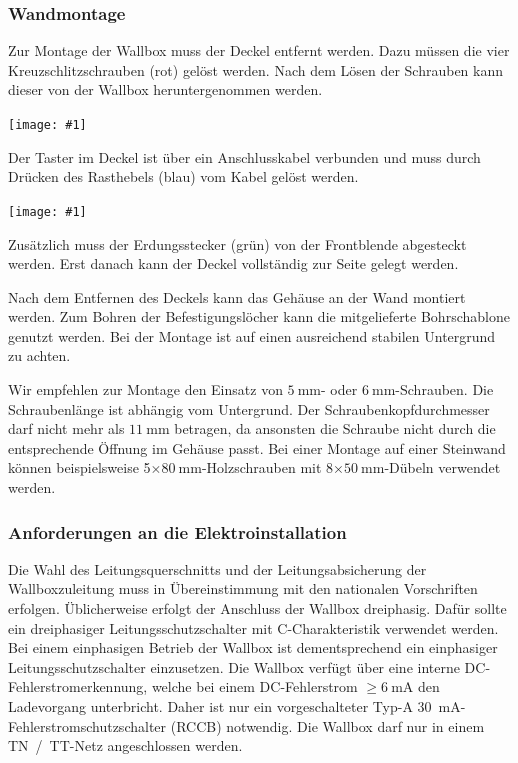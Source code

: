 \documentclass[a4paper,10pt]{article}
\newcommand{\hint}[1]{\begin{tcolorbox}[colback=boxgray,colframe=black,coltext=
white,title=Hinweis,left*=2mm,right*=2mm,boxsep=1mm,bottom=1mm,top=1mm]#1\end{tcolorbox}}
\newcommand{\gfx}[1]{\texttt{[image: \#1]}}
\begin{document}
\begin{multicols*}{2}
    \subsubsection{Wandmontage}\label{wandmontage}
    Zur Montage der Wallbox muss der Deckel entfernt werden. Dazu müssen die
    vier Kreuzschlitzschrauben (rot) gelöst werden.
    Nach dem Lösen der Schrauben kann dieser von der Wallbox heruntergenommen
    werden.

    \gfx{./img_warp3/resized/warp_screw_points_ready}


    \hint{Der Taster im Deckel ist über ein Anschlusskabel verbunden und muss
        durch Drücken des Rasthebels (blau) vom Kabel gelöst werden.}

    \gfx{./img_warp3/resized/warp3_frontLEDcable_arrow.jpg}

    Zusätzlich muss der Erdungsstecker (grün) von der Front\-blende abgesteckt werden.
    Erst danach kann der Deckel vollständig zur Seite gelegt werden.

    Nach dem Entfernen des Deckels kann das Gehäuse an der Wand montiert werden. Zum
    Bohren der Befestigungslöcher kann die mitgelieferte Bohrschablone genutzt
    werden. Bei der Montage ist auf einen ausreichend stabilen Untergrund zu
    achten.

    Wir empfehlen zur Montage den Einsatz von $\SI{5}{\milli\meter}$- oder
    $\SI{6}{\milli\meter}$-Schrauben. Die Schraubenlänge ist abhängig vom
    Untergrund. Der Schraubenkopfdurchmesser darf nicht mehr als
    $\SI{11}{\milli\meter}$ betragen, da ansonsten die Schraube nicht durch die
    entsprechende Öffnung im Gehäuse passt. Bei einer Montage auf einer Steinwand
    können beispielsweise 5$\times\SI{80}{\milli\meter}$-Holzschrauben
    mit 8$\times\SI{50}{\milli\meter}$-Dübeln verwendet werden.

    \subsubsection{Anforderungen an die Elektroinstallation}
    Die Wahl des Leitungsquerschnitts und der Lei\-tungs\-ab\-sicher\-ung der
    Wallboxzuleitung muss in Übereinstimmung mit den nationalen Vorschriften
    erfolgen. Üblicherweise erfolgt der Anschluss der Wallbox dreiphasig.
    Dafür sollte ein dreiphasiger Leitungsschutzschalter mit C-Charakteristik
    verwendet werden. Bei einem einphasigen Betrieb der Wallbox ist
    dementsprechend ein einphasiger Leitungsschutzschalter einzusetzen.
    Die Wallbox verfügt über eine interne DC-Fehlerstromerkennung, welche
    bei einem DC-Fehlerstrom $\geq \SI{6}{\milli\ampere}$ den Ladevorgang
    unterbricht. Daher ist nur ein vorgeschalteter Typ-A \SI{30}{\milli\ampere}-Fehlerstromschutzschalter (RCCB)
    notwendig.
    Die Wallbox darf nur in einem TN~/~TT-Netz angeschlossen werden.


\end{multicols*}
\end{document}
